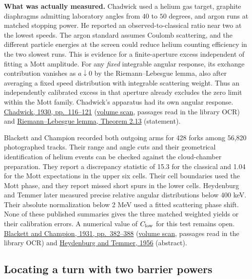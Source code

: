 \documentclass[11pt,a4paper]{article}
\begin{document}
\textbf{What was actually measured.} Chadwick used a helium gas target,
graphite diaphragms admitting laboratory angles from \(40\) to \(50\)
degrees, and argon runs at matched stopping power. He reported an
observed-to-classical ratio near two at the lowest speeds. The argon
standard assumes Coulomb scattering, and the different particle energies
at the screen could reduce helium counting efficiency in the two slowest
runs. This is evidence for a finite-aperture excess independent of
fitting a Mott amplitude. For any \emph{fixed} integrable angular
response, its exchange contribution vanishes as \(a\downarrow0\) by the
Riemann--Lebesgue lemma, also after averaging a fixed speed distribution
with integrable scattering weight. Thus an independently calibrated
excess in that aperture already excludes the zero limit within the Mott
family. Chadwick's apparatus had its own angular response.
\href{https://doi.org/10.1098/rspa.1930.0098}{Chadwick, 1930,
pp.~116--121} (\href{https://archive.org/details/dli.ernet.27026}{volume
scan}, passages read in the library OCR) and
\href{https://www.iitg.ac.in/rksri/MA746\%20Fourier\%20Analysis\%20Lecture\%20notes\%202025.pdf}{Riemann--Lebesgue
lemma, Theorem 2.13} (statement).

Blackett and Champion recorded both outgoing arms for 428 forks among
56,820 photographed tracks. Their range and angle cuts and their
geometrical identification of helium events can be checked against the
cloud-chamber preparation. They report a discrepancy statistic of 15.3
for the classical and 1.04 for the Mott expectations in the upper six
cells. Their cell boundaries used the Mott phase, and they report missed
short spurs in the lower cells. Heydenburg and Temmer later measured
precise relative angular distributions below 400 keV. Their absolute
normalization below 2 MeV used a fitted scattering phase shift. None of
these published summaries gives the three matched weighted yields or
their calibration errors. A numerical value of \(C_{\rm low}\) for this
test remains open.
\href{https://doi.org/10.1098/rspa.1931.0011}{Blackett and Champion,
1931, pp.~382--388}
(\href{https://archive.org/details/dli.ernet.7436}{volume scan},
passages read in the library OCR) and
\href{https://journals.aps.org/pr/abstract/10.1103/PhysRev.104.123}{Heydenburg
and Temmer, 1956} (abstract).

\subsection{Locating a turn with two barrier
powers}\label{locating-a-turn-with-two-barrier-powers}
\end{document}

